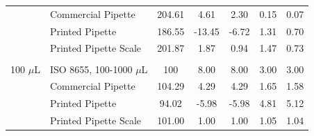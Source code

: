 \documentclass[10pt,letterpaper]{article}
\begin{document}
\begin{table}[!ht]
\begin{adjustwidth}{-2.25in}{0in}
\begin{tabular}{llccccc}
			& Commercial Pipette    & 204.61  & 4.61             & 2.30         & 0.15         & 0.07          \\
			& Printed Pipette       & 186.55  & -13.45           & -6.72        & 1.31         & 0.70          \\
			& Printed Pipette Scale & 201.87  & 1.87             & 0.94         & 1.47         & 0.73          \\
			&                       &         &                  &              &              &               \\
			100 $\mu$L  & ISO 8655, 100-1000 $\mu$L & 100     & 8.00             & 8.00         & 3.00         & 3.00          \\
			& Commercial Pipette    & 104.29  & 4.29             & 4.29         & 1.65         & 1.58          \\
			& Printed Pipette       & 94.02   & -5.98            & -5.98        & 4.81         & 5.12          \\
			& Printed Pipette Scale & 101.00  & 1.00             & 1.00         & 1.05         & 1.04         
		\end{tabular}
	\end{adjustwidth}
\end{table}
\end{document}
